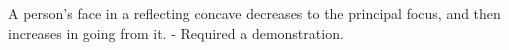 A person's face in a reflecting concave decreases
to the principal focus, and then increases in going
from it. - Required a demonstration.
